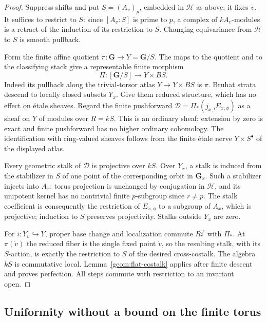 \begin{proof}
Suppress shifts and put \(S=(A_v)_p\), embedded in \(\mathcal H\) as
above; it fixes \(\dot v\). It suffices to restrict to \(S\): since
\([A_v:S]\) is prime to \(p\), a complex of \(kA_v\)-modules is a
retract of the induction of its restriction to \(S\).
Changing equivariance from \(\mathcal H\) to \(S\) is smooth pullback.

Form the finite affine quotient \(\pi:\mathbf G\to Y=\mathbf G/S\).
The maps to the quotient and to the classifying stack give a
representable finite morphism
\[
 \Pi:[\mathbf G/S]\longrightarrow Y\times BS.
\]
Indeed its pullback along the trivial-torsor atlas
\(Y\to Y\times BS\) is \(\pi\). Bruhat strata descend to locally
closed subsets \(Y_x\). Give them reduced structure, which has no
effect on \'etale sheaves. Regard the finite pushforward
\(\mathcal D=\Pi_*(j_{x,!}E_{x,\phi})\) as a sheaf on \(Y\) of modules
over \(R=kS\). This is an ordinary sheaf: extension by zero is exact
and finite pushforward has no higher ordinary cohomology. The
identification with ring-valued sheaves follows from the finite
\'etale nerve \(Y\times S^\bullet\) of the displayed atlas.

Every geometric stalk of \(\mathcal D\) is projective over \(kS\).
Over \(Y_x\), a stalk is induced from the stabilizer in \(S\) of one
point of the corresponding orbit in \(\mathbf G_x\). Such a stabilizer
injects into \(A_x\): torus projection is unchanged by conjugation in
\(\mathcal H\), and its unipotent kernel has no nontrivial finite
\(p\)-subgroup since \(r\ne p\). The stalk coefficient is consequently
the restriction of \(E_{x,\phi}\) to a subgroup of \(A_x\), which is
projective; induction to \(S\) preserves projectivity. Stalks outside
\(Y_x\) are zero.

For \(i:Y_v\hookrightarrow Y\), proper base change and localization
commute \(Ri^!\) with \(\Pi_*\). At \(\pi(\dot v)\) the reduced
fiber is the single fixed point \(\dot v\), so the resulting stalk,
with its \(S\)-action, is exactly the restriction to \(S\) of the
desired cross-costalk. The algebra \(kS\) is commutative local.
Lemma~\ref{geom:flat-costalk} applies after finite descent and proves
perfection. All steps commute with restriction to an invariant open.
\end{proof}

\subsection{Uniformity without a bound on the finite torus}


